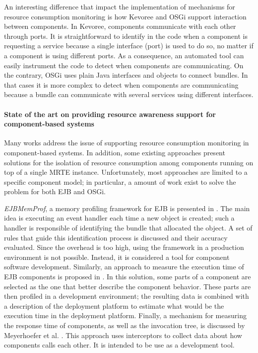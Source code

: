An interesting difference that impact the implementation of mechanisms for resource consumption monitoring is how Kevoree and OSGi support interaction between components.
In Kevoree, components communicate with each other through ports.
It is straightforward to identify in the code when a component is requesting a service because a single interface (port) is used to do so, no matter if a component is using different ports. 
As a consequence, an automated tool can easily instrument the code to detect when components are communicating.
On the contrary, OSGi uses plain Java interfaces and objects to connect bundles.
In that cases it is more complex to detect when components are communicating because a bundle can communicate with several services using different interfaces. 

\paragraph{State of the art on providing resource awareness support for component-based systems}

Many works address the issue of supporting resource consumption monitoring in component-based systems.
In addition, some existing approaches present solutions for the isolation of resource consumption among components running on top of a single MRTE instance.
Unfortunately, most approaches are limited to a specific component model; in particular, a amount of work exist to solve the problem for both EJB and OSGi.

\textit{EJBMemProf}, a memory profiling framework for EJB is presented in \cite{Meyerhoefer2005}.
The main idea is executing an event handler each time a new object is created; such a handler is responsible of identifying the bundle that allocated the object.
A set of rules that guide this identification process is discussed and their accuracy evaluated.
Since the overhead is too high, using the framework in a production environment is not possible.
Instead, it is considered a tool for component software development.
Similarly, an approach to measure the execution time of EJB components is proposed in \cite{Meyerhofer05towardsplatform-independent}.
In this solution, some parts of a component are selected as the one that better describe the component behavior.
These parts are then profiled in a development environment; the resulting data is combined with a description of the deployment platform to estimate what would be the execution time in the deployment platform.
Finally, a mechanism for measuring the response time of components, as well as the invocation tree, is discussed by Meyerhoefer et al. \cite{Meyerhoefer2007}.
This approach uses interceptors to collect data about how components calls each other.
It is intended to be use as a development tool.

